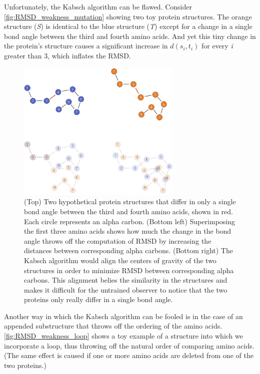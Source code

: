 \begin{qbox}\end{qbox}

Unfortunately, the Kabsch algorithm can be flawed. Consider \autoref{fig:RMSD_weakness_mutation} showing two toy protein structures. The orange structure (\textit{S}) is identical to the blue structure (\textit{T}) except for a change in a single bond angle between the third and fourth amino acids. And yet this tiny change in the protein's structure causes a significant increase in $d(s_{i}, t_{i})$ for every \textit{i} greater than 3, which inflates the RMSD.

\begin{figure}[h]
	\centering
	\mySfFamily
	\includegraphics[width = 0.7\textwidth]{../images/RMSD_weakness_mutation.png}
	\caption{(Top) Two hypothetical protein structures that differ in only a single bond angle between the third and fourth amino acids, shown in red. Each circle represents an alpha carbon. (Bottom left) Superimposing the first three amino acids shows how much the change in the bond angle throws off the computation of RMSD by increasing the distances between corresponding alpha carbons. (Bottom right) The Kabsch algorithm would align the centers of gravity of the two structures in order to minimize RMSD between corresponding alpha carbons. This alignment belies the similarity in the structures and makes it difficult for the untrained observer to notice that the two proteins only really differ in a single bond angle.}
	\label{fig:RMSD_weakness_mutation}
\end{figure}

Another way in which the Kabsch algorithm can be fooled is in the case of an appended substructure that throws off the ordering of the amino acids. \autoref{fig:RMSD_weakness_loop} shows a toy example of a structure into which we incorporate a loop, thus throwing off the natural order of comparing amino acids. (The same effect is caused if one or more amino acids are deleted from one of the two proteins.)

